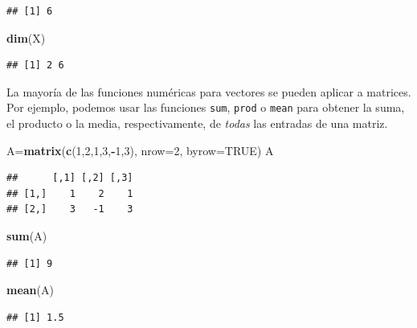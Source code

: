 \documentclass[]{book}
\newenvironment{Shaded}{\begin{snugshade}}{\end{snugshade}}
\newcommand{\DataTypeTok}[1]{\textcolor[rgb]{0.13,0.29,0.53}{#1}}
\newcommand{\DecValTok}[1]{\textcolor[rgb]{0.00,0.00,0.81}{#1}}
\newcommand{\KeywordTok}[1]{\textcolor[rgb]{0.13,0.29,0.53}{\textbf{#1}}}
\newcommand{\NormalTok}[1]{#1}
\newcommand{\OperatorTok}[1]{\textcolor[rgb]{0.81,0.36,0.00}{\textbf{#1}}}
\newcommand{\OtherTok}[1]{\textcolor[rgb]{0.56,0.35,0.01}{#1}}
\theoremstyle{definition}
\theoremstyle{definition}
\theoremstyle{definition}
\theoremstyle{remark}
\begin{document}
\begin{verbatim}
## [1] 6
\end{verbatim}

\begin{Shaded}
\begin{Highlighting}[]
\KeywordTok{dim}\NormalTok{(X)}
\end{Highlighting}
\end{Shaded}

\begin{verbatim}
## [1] 2 6
\end{verbatim}

La mayoría de las funciones numéricas para vectores se pueden aplicar a matrices. Por ejemplo, podemos usar las funciones \texttt{sum}, \texttt{prod} o \texttt{mean} para obtener la suma, el producto o la media, respectivamente, de \emph{todas} las entradas de una matriz.

\begin{Shaded}
\begin{Highlighting}[]
\NormalTok{A=}\KeywordTok{matrix}\NormalTok{(}\KeywordTok{c}\NormalTok{(}\DecValTok{1}\NormalTok{,}\DecValTok{2}\NormalTok{,}\DecValTok{1}\NormalTok{,}\DecValTok{3}\NormalTok{,}\OperatorTok{-}\DecValTok{1}\NormalTok{,}\DecValTok{3}\NormalTok{), }\DataTypeTok{nrow=}\DecValTok{2}\NormalTok{, }\DataTypeTok{byrow=}\OtherTok{TRUE}\NormalTok{)}
\NormalTok{A}
\end{Highlighting}
\end{Shaded}

\begin{verbatim}
##      [,1] [,2] [,3]
## [1,]    1    2    1
## [2,]    3   -1    3
\end{verbatim}

\begin{Shaded}
\begin{Highlighting}[]
\KeywordTok{sum}\NormalTok{(A)}
\end{Highlighting}
\end{Shaded}

\begin{verbatim}
## [1] 9
\end{verbatim}

\begin{Shaded}
\begin{Highlighting}[]
\KeywordTok{mean}\NormalTok{(A)}
\end{Highlighting}
\end{Shaded}

\begin{verbatim}
## [1] 1.5
\end{verbatim}
\end{document}
